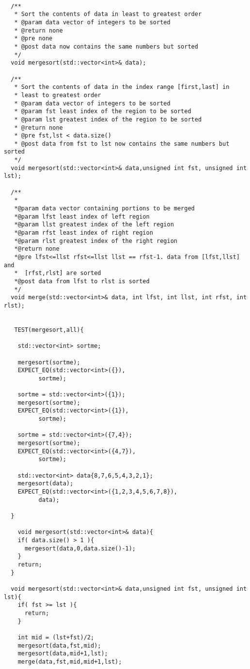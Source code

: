 \documentclass[]{tufte-handout}
\begin{document}
\begin{verbatim}

  /**
   * Sort the contents of data in least to greatest order
   * @param data vector of integers to be sorted
   * @return none
   * @pre none
   * @post data now contains the same numbers but sorted
   */
  void mergesort(std::vector<int>& data);

  /**
   * Sort the contents of data in the index range [first,last] in 
   * least to greatest order
   * @param data vector of integers to be sorted
   * @param fst least index of the region to be sorted
   * @param lst greatest index of the region to be sorted
   * @return none
   * @pre fst,lst < data.size()
   * @post data from fst to lst now contains the same numbers but sorted
   */
  void mergesort(std::vector<int>& data,unsigned int fst, unsigned int lst);

  /**
   *
   *@param data vector containing portions to be merged
   *@param lfst least index of left region
   *@param llst greatest index of the left region
   *@param rfst least index of right region
   *@param rlst greatest index of the right region
   *@return none
   *@pre lfst<=llst rfst<=llst llst == rfst-1. data from [lfst,llst] and 
   *  [rfst,rlst] are sorted
   *@post data from lfst to rlst is sorted
   */
  void merge(std::vector<int>& data, int lfst, int llst, int rfst, int rlst);

   
   TEST(mergesort,all){
    
    std::vector<int> sortme;

    mergesort(sortme);
    EXPECT_EQ(std::vector<int>({}),
	      sortme);

    sortme = std::vector<int>({1});
    mergesort(sortme);
    EXPECT_EQ(std::vector<int>({1}),
	      sortme);

    sortme = std::vector<int>({7,4});
    mergesort(sortme);
    EXPECT_EQ(std::vector<int>({4,7}),
	      sortme);

    std::vector<int> data{8,7,6,5,4,3,2,1};
    mergesort(data);
    EXPECT_EQ(std::vector<int>({1,2,3,4,5,6,7,8}),
	      data);
    
  }

    void mergesort(std::vector<int>& data){
    if( data.size() > 1 ){
      mergesort(data,0,data.size()-1);
    }
    return;
  }

  void mergesort(std::vector<int>& data,unsigned int fst, unsigned int lst){
    if( fst >= lst ){
      return;
    }
    
    int mid = (lst+fst)/2;
    mergesort(data,fst,mid);
    mergesort(data,mid+1,lst);
    merge(data,fst,mid,mid+1,lst);
    

\end{verbatim}
\end{document}
